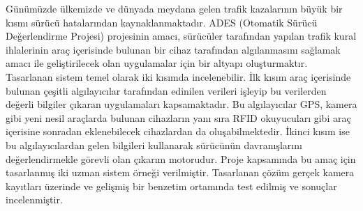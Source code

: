 \documentclass[a4paper,oneside,12pt]{report}
\begin{document}
\begin{ozet}
G\"un\"um\"uzde \"ulkemizde ve d\"unyada meydana gelen trafik kazalar{\i}n{\i}n b\"uy\"uk bir k{\i}sm{\i} s\"ur\"uc\"u hatalar{\i}ndan kaynaklanmaktad{\i}r. ADES (Otomatik S\"ur\"uc\"u De\u{g}erlendirme Projesi) projesinin amac{\i}, s\"ur\"uc\"uler taraf{\i}ndan yap{\i}lan trafik kural ihlalerinin ara\c{c} i\c{c}erisinde bulunan bir cihaz taraf{\i}ndan alg{\i}lanmas{\i}n{\i} sa\u{g}lamak amac{\i} ile geli\c{s}tirilecek olan uygulamalar i\c{c}in bir altyap{\i} olu\c{s}turmakt{\i}r. Tasarlanan sistem temel olarak iki k{\i}s{\i}mda incelenebilir. \.Ilk k{\i}s{\i}m ara\c{c} i\c{c}erisinde bulunan \c{c}e\c{s}itli alg{\i}lay{\i}c{\i}lar taraf{\i}ndan edinilen verileri i\c{s}leyip bu verilerden de\u{g}erli bilgiler \c{c}{\i}karan uygulamalar{\i} kapsamaktad{\i}r. Bu alg{\i}lay{\i}c{\i}lar GPS, kamera gibi yeni nesil ara\c{c}larda bulunan cihazlar{\i}n yan{\i} s{\i}ra RFID okuyucular{\i} gibi ara\c{c} i\c{c}erisine sonradan eklenebilecek cihazlardan da olu\c{s}abilmektedir. \.Ikinci k{\i}s{\i}m ise bu alg{\i}lay{\i}c{\i}lardan gelen bilgileri kullanarak s\"ur\"uc\"un\"un davran{\i}\c{s}lar{\i}n{\i} de\u{g}erlendirmekle g\"orevli olan \c{c}{\i}kar{\i}m motorudur. Proje kapsam{\i}nda bu ama\c{c} i\c{c}in tasarlanm{\i}\c{s} iki uzman sistem \"orne\u{g}i verilmi\c{s}tir. Tasarlanan \c{c}\"oz\"um ger\c{c}ek kamera kay{\i}tlar{\i} \"uzerinde ve geli\c{s}mi\c{s} bir benzetim ortam{\i}nda test edilmi\c{s} ve sonu\c{c}lar incelenmi\c{s}tir. 

\end{ozet}


\tableofcontents 
\listoffigures
\listoftables  
\end{document}
